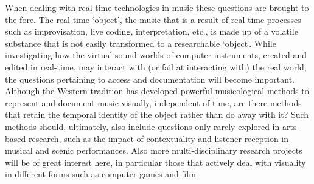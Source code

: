 When dealing with real-time technologies in music these questions are brought to the fore. The real-time `object', the music that is a result of real-time processes such as improvisation, live coding, interpretation, etc., is made up of a volatile substance that is not easily transformed to a researchable `object'. While investigating how the virtual sound worlds of computer instruments, created and edited in real-time, may interact with (or fail at interacting with) the real world, the questions pertaining to access and documentation will become important. 
Although the Western tradition has developed powerful musicological methods to represent and document music visually, \parencite{bregman94} independent of time, are there methods that retain the temporal identity of the object rather than do away with it? Such methods should, ultimately, also include questions only rarely explored in arts-based research, such as the impact of contextuality and listener reception in musical and scenic performances. Also more multi-disciplinary research projects will be of great interest here, in particular those that actively deal with visuality in different forms such as computer games and film. 





